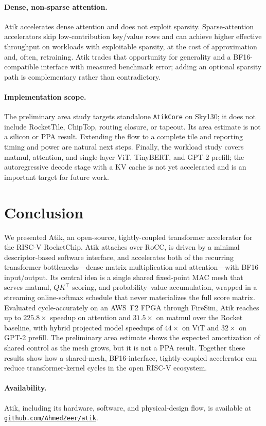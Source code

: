 \documentclass[sigconf,nonacm]{acmart}
\begin{document}
\paragraph{Dense, non-sparse attention.}
Atik accelerates dense attention and does not exploit sparsity. Sparse-attention
accelerators skip low-contribution key/value rows and can achieve higher
effective throughput on workloads with exploitable sparsity, at the cost of
approximation and, often, retraining. Atik trades that opportunity for
generality and a BF16-compatible interface with measured benchmark error; adding an optional
sparsity path is complementary rather than contradictory.

\paragraph{Implementation scope.}
The preliminary area study targets standalone \texttt{AtikCore} on Sky130; it
does not include RocketTile, ChipTop, routing closure, or tapeout. Its area
estimate is not a silicon or PPA result. Extending the flow to a complete tile
and reporting timing and power are natural
next steps. Finally, the workload study covers matmul,
attention, and single-layer ViT, TinyBERT, and GPT-2 prefill; the autoregressive
decode stage with a KV cache is not yet accelerated and is an important target
for future work.

\section{Conclusion}
\label{sec:conclusion}

We presented Atik, an open-source, tightly-coupled transformer accelerator for
the RISC-V RocketChip. Atik attaches over RoCC, is driven by a minimal
descriptor-based software interface, and accelerates both of the recurring
transformer bottlenecks---dense matrix multiplication and attention---with BF16
input/output. Its central idea is a single shared fixed-point MAC mesh that serves
matmul, $QK^\top$ scoring, and probability--value accumulation, wrapped in a
streaming online-softmax schedule that never materializes the full score matrix.
Evaluated cycle-accurately on an AWS~F2 FPGA through FireSim, Atik reaches up to
$225.8\times$ speedup on attention and $31.5\times$ on matmul over the Rocket
baseline, with hybrid projected model speedups of $44\times$ on ViT and
$32\times$ on GPT-2 prefill. The preliminary area estimate shows the expected
amortization of shared control as the mesh grows, but it is not a PPA result.
Together these results show how a shared-mesh, BF16-interface,
tightly-coupled accelerator can reduce transformer-kernel cycles in the open
RISC-V ecosystem.

\paragraph{Availability.}
Atik, including its hardware, software, and physical-design flow, is available
at \href{https://github.com/AhmedZeer/atik}{\texttt{github.com/AhmedZeer/atik}}.



\end{document}
